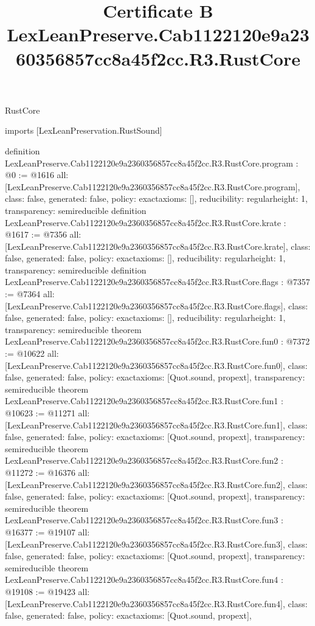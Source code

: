 \begin{lexlean}{RustCore}
\title{Certificate B LexLeanPreserve.Cab1122120e9a2360356857cc8a45f2cc.R3.RustCore}
\begin{coremodule}
imports [LexLeanPreservation.RustSound]

definition LexLeanPreserve.Cab1122120e9a2360356857cc8a45f2cc.R3.RustCore.program : @0 := @1616 {
  all: [LexLeanPreserve.Cab1122120e9a2360356857cc8a45f2cc.R3.RustCore.program],
  class: false,
  generated: false,
  policy: exact{axioms: []},
  reducibility: regular{height: 1},
  transparency: semireducible
}
definition LexLeanPreserve.Cab1122120e9a2360356857cc8a45f2cc.R3.RustCore.krate : @1617 := @7356 {
  all: [LexLeanPreserve.Cab1122120e9a2360356857cc8a45f2cc.R3.RustCore.krate],
  class: false,
  generated: false,
  policy: exact{axioms: []},
  reducibility: regular{height: 1},
  transparency: semireducible
}
definition LexLeanPreserve.Cab1122120e9a2360356857cc8a45f2cc.R3.RustCore.flags : @7357 := @7364 {
  all: [LexLeanPreserve.Cab1122120e9a2360356857cc8a45f2cc.R3.RustCore.flags],
  class: false,
  generated: false,
  policy: exact{axioms: []},
  reducibility: regular{height: 1},
  transparency: semireducible
}
theorem LexLeanPreserve.Cab1122120e9a2360356857cc8a45f2cc.R3.RustCore.fun0 : @7372 := @10622 {
  all: [LexLeanPreserve.Cab1122120e9a2360356857cc8a45f2cc.R3.RustCore.fun0],
  class: false,
  generated: false,
  policy: exact{axioms: [Quot.sound, propext]},
  transparency: semireducible
}
theorem LexLeanPreserve.Cab1122120e9a2360356857cc8a45f2cc.R3.RustCore.fun1 : @10623 := @11271 {
  all: [LexLeanPreserve.Cab1122120e9a2360356857cc8a45f2cc.R3.RustCore.fun1],
  class: false,
  generated: false,
  policy: exact{axioms: [Quot.sound, propext]},
  transparency: semireducible
}
theorem LexLeanPreserve.Cab1122120e9a2360356857cc8a45f2cc.R3.RustCore.fun2 : @11272 := @16376 {
  all: [LexLeanPreserve.Cab1122120e9a2360356857cc8a45f2cc.R3.RustCore.fun2],
  class: false,
  generated: false,
  policy: exact{axioms: [Quot.sound, propext]},
  transparency: semireducible
}
theorem LexLeanPreserve.Cab1122120e9a2360356857cc8a45f2cc.R3.RustCore.fun3 : @16377 := @19107 {
  all: [LexLeanPreserve.Cab1122120e9a2360356857cc8a45f2cc.R3.RustCore.fun3],
  class: false,
  generated: false,
  policy: exact{axioms: [Quot.sound, propext]},
  transparency: semireducible
}
theorem LexLeanPreserve.Cab1122120e9a2360356857cc8a45f2cc.R3.RustCore.fun4 : @19108 := @19423 {
  all: [LexLeanPreserve.Cab1122120e9a2360356857cc8a45f2cc.R3.RustCore.fun4],
  class: false,
  generated: false,
  policy: exact{axioms: [Quot.sound, propext]},
}
\end{coremodule}
\end{lexlean}
